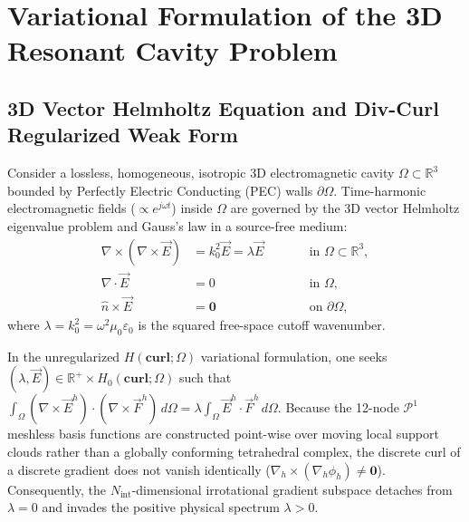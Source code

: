 \documentclass[preprint,12pt]{elsarticle}
\newcommand{\curl}{\nabla \times}
\newcommand{\divg}{\nabla \cdot}
\newcommand{\R}{\mathbb{R}}
\newcommand{\Hcurl}{H(\mathbf{curl};\Omega)}
\begin{document}
\section{Variational Formulation of the 3D Resonant Cavity Problem}
\label{sec:variational}

\subsection{3D Vector Helmholtz Equation and Div-Curl Regularized Weak Form}
\label{subsec:weak_form_3d}

Consider a lossless, homogeneous, isotropic 3D electromagnetic cavity $\Omega \subset \R^3$ bounded by Perfectly Electric Conducting (PEC) walls $\partial\Omega$. Time-harmonic electromagnetic fields ($\propto e^{j\omega t}$) inside $\Omega$ are governed by the 3D vector Helmholtz eigenvalue problem and Gauss's law in a source-free medium:
\begin{subequations}
\label{eq:strong_cavity_3d}
\begin{alignat}{2}
    \curl(\curl\vec{E}) &= k_0^2 \vec{E} = \lambda \vec{E} &\qquad &\text{in } \Omega \subset \R^3, \label{eq:curl_curl_3d} \\
    \divg\vec{E} &= 0 &\qquad &\text{in } \Omega, \label{eq:gauss_law_3d} \\
    \hat{n} \times \vec{E} &= \mathbf{0} &\qquad &\text{on } \partial\Omega, \label{eq:pec_wall_3d}
\end{alignat}
\end{subequations}
where $\lambda = k_0^2 = \omega^2 \mu_0 \varepsilon_0$ is the squared free-space cutoff wavenumber.

In the unregularized $\Hcurl$ variational formulation, one seeks $(\lambda, \vec{E}) \in \R^+ \times H_0(\mathbf{curl};\Omega)$ such that $\int_\Omega (\curl\vec{E}^h)\cdot(\curl\vec{F}^h)\,d\Omega = \lambda \int_\Omega \vec{E}^h\cdot\vec{F}^h\,d\Omega$. Because the 12-node $\mathcal{P}^1$ meshless basis functions are constructed point-wise over moving local support clouds rather than a globally conforming tetrahedral complex, the discrete curl of a discrete gradient does not vanish identically ($\nabla_h \times (\nabla_h \phi_h) \neq \mathbf{0}$). Consequently, the $N_{\text{int}}$-dimensional irrotational gradient subspace detaches from $\lambda = 0$ and invades the positive physical spectrum $\lambda > 0$.
\end{document}
